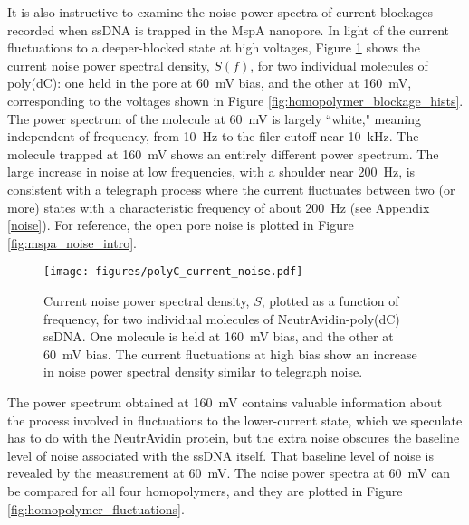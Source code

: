It is also instructive to examine the noise power spectra of current blockages recorded when ssDNA is trapped in the MspA nanopore.  In light of the current fluctuations to a deeper-blocked state at high voltages, Figure \ref{fig:polyC_fluctuations} shows the current noise power spectral density, $S(f)$, for two individual molecules of poly(dC): one held in the pore at \SI{60}{\mV} bias, and the other at \SI{160}{\mV}, corresponding to the voltages shown in Figure \ref{fig:homopolymer_blockage_hists}.  The power spectrum of the molecule at \SI{60}{\mV} is largely ``white," meaning independent of frequency, from \SI{10}{\Hz} to the filer cutoff near \SI{10}{\kHz}.  The molecule trapped at \SI{160}{\mV} shows an entirely different power spectrum.  The large increase in noise at low frequencies, with a shoulder near \SI{200}{\Hz}, is consistent with a telegraph process where the current fluctuates between two (or more) states \citep{Dutta1981} with a characteristic frequency of about \SI{200}{\Hz} (see Appendix \ref{noise}).  For reference, the open pore noise is plotted in Figure \ref{fig:mspa_noise_intro}.

\begin{figure}[h]
\begin{centering}
\texttt{[image: figures/polyC\_current\_noise.pdf]}
\caption[Current fluctuations for single molecule poly(dC) ssDNA]{Current noise power spectral density, $S$, plotted as a function of frequency, for two individual molecules of NeutrAvidin-poly(dC) ssDNA.  One molecule is held at \SI{160}{\mV} bias, and the other at \SI{60}{\mV} bias.  The current fluctuations at high bias show an increase in noise power spectral density similar to telegraph noise.}
\label{fig:polyC_fluctuations}
\end{centering}
\end{figure}

The power spectrum obtained at \SI{160}{\mV} contains valuable information about the process involved in fluctuations to the lower-current state, which we speculate has to do with the NeutrAvidin protein, but the extra noise obscures the baseline level of noise associated with the ssDNA itself.  That baseline level of noise is revealed by the measurement at \SI{60}{\mV}.  The noise power spectra at \SI{60}{\mV} can be compared for all four homopolymers, and they are plotted in Figure \ref{fig:homopolymer_fluctuations}.

